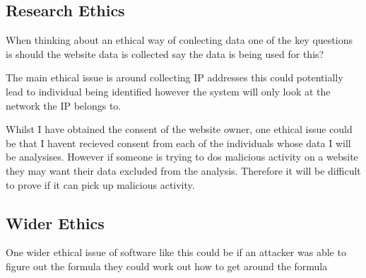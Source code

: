 \subsection{Research Ethics}

When thinking about an ethical way of conlecting data one of the key questions is should the website data is collected say the data is being used for this?

The main ethical issue is around collecting IP addresses this could potentially lead to individual being identified however the system will only look at the network the IP belongs to. 

Whilst I have obtained the consent of the website owner, one ethical issue could be that I havent recieved consent from each of the individuals whose data I will be analysises. However if someone is trying to dos malicious activity on a website they may want their data excluded from the analysis. Therefore it will be difficult to prove if it can pick up malicious activity.

\subsection{Wider Ethics}

One wider ethical issue of software like this could be if an attacker was able to figure out the formula they could work out how to get around the formula